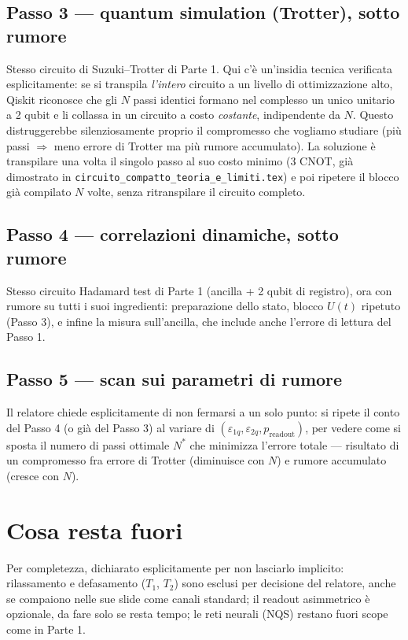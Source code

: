 \documentclass[11pt,a4paper]{article}
\begin{document}
\subsection{Passo 3 --- quantum simulation (Trotter), sotto rumore}
\label{subsec:passo3}

Stesso circuito di Suzuki--Trotter di Parte 1. Qui c'è un'insidia tecnica verificata
esplicitamente: se si transpila \emph{l'intero} circuito a un livello di ottimizzazione
alto, Qiskit riconosce che gli $N$ passi identici formano nel complesso un unico
unitario a 2 qubit e li collassa in un circuito a costo \emph{costante}, indipendente da
$N$. Questo distruggerebbe silenziosamente proprio il compromesso che vogliamo
studiare (più passi $\Rightarrow$ meno errore di Trotter ma più rumore accumulato). La
soluzione è transpilare una volta il singolo passo al suo costo minimo (3 CNOT, già
dimostrato in \texttt{circuito\_compatto\_teoria\_e\_limiti.tex}) e poi ripetere il
blocco già compilato $N$ volte, senza ritranspilare il circuito completo.

\subsection{Passo 4 --- correlazioni dinamiche, sotto rumore}

Stesso circuito Hadamard test di Parte 1 (ancilla + 2 qubit di registro), ora con
rumore su tutti i suoi ingredienti: preparazione dello stato, blocco $U(t)$ ripetuto
(Passo 3), e infine la misura sull'ancilla, che include anche l'errore di lettura del
Passo 1.

\subsection{Passo 5 --- scan sui parametri di rumore}

Il relatore chiede esplicitamente di non fermarsi a un solo punto: si ripete il conto
del Passo 4 (o già del Passo 3) al variare di $(\varepsilon_{1q},\varepsilon_{2q},
p_\text{readout})$, per vedere come si sposta il numero di passi ottimale $N^*$ che
minimizza l'errore totale --- risultato di un compromesso fra errore di Trotter
(diminuisce con $N$) e rumore accumulato (cresce con $N$).

\section{Cosa resta fuori}

Per completezza, dichiarato esplicitamente per non lasciarlo implicito: rilassamento e
defasamento ($T_1$, $T_2$) sono esclusi per decisione del relatore, anche se compaiono
nelle sue slide come canali standard; il readout asimmetrico è opzionale, da fare solo
se resta tempo; le reti neurali (NQS) restano fuori scope come in Parte 1.
\end{document}
